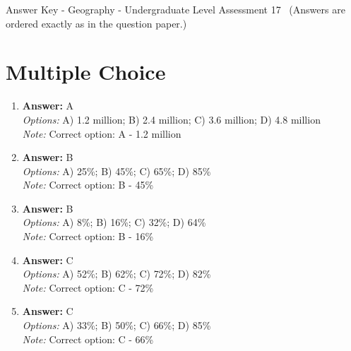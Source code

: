 \documentclass[12pt]{article}
\begin{document}
\begin{center}
Answer Key - Geography - Undergraduate Level Assessment 17 \
\small (Answers are ordered exactly as in the question paper.)
\end{center}

\section*{Multiple Choice}
\begin{enumerate}[label=\arabic*.]
\item \textbf{Answer:} A
\\ \textit{Options:} A) 1.2 million; B) 2.4 million; C) 3.6 million; D) 4.8 million
\\ \textit{Note:} Correct option: A - 1.2 million
\item \textbf{Answer:} B
\\ \textit{Options:} A) 25\%; B) 45\%; C) 65\%; D) 85\%
\\ \textit{Note:} Correct option: B - 45\%
\item \textbf{Answer:} B
\\ \textit{Options:} A) 8\%; B) 16\%; C) 32\%; D) 64\%
\\ \textit{Note:} Correct option: B - 16\%
\item \textbf{Answer:} C
\\ \textit{Options:} A) 52\%; B) 62\%; C) 72\%; D) 82\%
\\ \textit{Note:} Correct option: C - 72\%
\item \textbf{Answer:} C
\\ \textit{Options:} A) 33\%; B) 50\%; C) 66\%; D) 85\%
\\ \textit{Note:} Correct option: C - 66\%
\end{enumerate}
\end{document}
